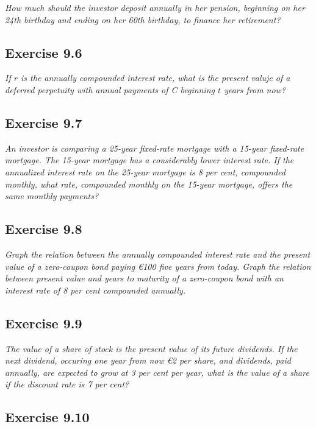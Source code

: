\documentclass[]{book}
\newcommand{\euro}{€}
\theoremstyle{definition}
\theoremstyle{definition}
\theoremstyle{remark}
\begin{document}
\emph{How much should the investor deposit annually in her pension,
beginning on her 24th birthday and ending on her 60th birthday, to
finance her retirement?} \citep[p.307]{book}

\subsection{Exercise 9.6}\label{exercise-9.6}

\emph{If \(r\) is the annually compounded interest rate, what is the
present valuje of a deferred perpetuity with annual payments of C
beginning \(t\) years from now?} \citep[p.307]{book}

\subsection{Exercise 9.7}\label{exercise-9.7}

\emph{An investor is comparing a 25-year fixed-rate mortgage with a
15-year fixed-rate mortgage. The 15-year mortgage has a considerably
lower interest rate. If the annualized interest rate on the 25-year
mortgage is 8 per cent, compounded monthly, what rate, compounded
monthly on the 15-year mortgage, offers the same monthly payments?}
\citep[p.307]{book}

\subsection{Exercise 9.8}\label{exercise-9.8}

\emph{Graph the relation between the annually compounded interest rate
and the present value of a zero-coupon bond paying \euro{}100 five years
from today. Graph the relation between present value and years to
maturity of a zero-coupon bond with an interest rate of 8 per cent
compounded annually.} \citep[p.307]{book}

\subsection{Exercise 9.9}\label{exercise-9.9}

\emph{The value of a share of stock is the present value of its future
dividends. If the next dividend, occuring one year from now \euro{}2 per
share, and dividends, paid annually, are expected to grow at 3 per cent
per year, what is the value of a share if the discount rate is 7 per
cent?} \citep[p.307]{book}

\subsection{Exercise 9.10}\label{exercise-9.10}
\end{document}
